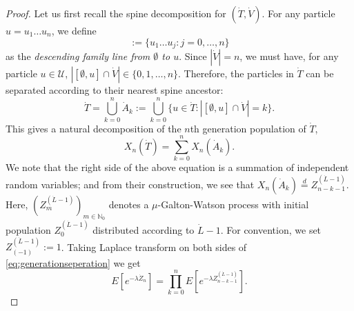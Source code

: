 \documentclass[12pt,a4paper]{amsart}
\numberwithin{equation}{section}
\begin{document}
\begin{proof}
	
	Let us first recall the spine decomposition for $(\dot T,\dot V)$.
	For any particle $u=u_1\dots u_n$, we define
\begin{equation*}
	[\emptyset, u]
	:= \{u_1\dots u_j:j=0,\dots, n \}
\end{equation*}
	as the \emph{descending family line from $\emptyset$ to $u$}.
	Since $|\dot V|=n$, we must have, for any particle $u\in\mathcal U$, $|[\emptyset, u]\cap\dot V|\in \{0,1,\dots,n\}$.
	Therefore, the particles in $\dot T$ can be separated according to their nearest spine ancestor:
\[
		\dot T
	=
		\bigcup_{k=0}^n\dot A_k
	:=
		\bigcup_{k=0}^n\{u\in\dot T:| [\emptyset, u] \cap \dot V |=k\}.
\]
	This gives a natural decomposition of the $n$th generation population of $\dot T$,
\begin{equation}
\label{eq:generationseperation}
		X_n(\dot T)
	=
		\sum_{k=0}^nX_n(\dot A_k).
\end{equation}
	We note that the right side of the above equation is a summation of independent random variables; 
	and from their construction, we see that $X_n(\dot A_k) \overset{d}= Z_{n-k-1}^{(\dot L - 1)}$.
	Here,  $(Z^{(\dot L - 1)}_m)_{m\in \mathbb N_0}$ denotes a $\mu$-Galton-Watson process with initial population $Z^{(\dot L - 1)}_0$ distributed according to $\dot L - 1$. 
	For convention, we set $Z^{(\dot L - 1)}_{(-1)}:= 1$.
Taking Laplace transform on both sides of \eqref{eq:generationseperation} we get
\begin{equation} \label{eq: laplace transform of one-spine decomposition}
	E [e^{-\lambda \dot Z_n}] 
	= \prod_{k = 0}^n E[ e^{-\lambda Z^{(\dot L - 1)}_{n-k-1}} ].
\end{equation}
	

\end{proof}
\end{document}
